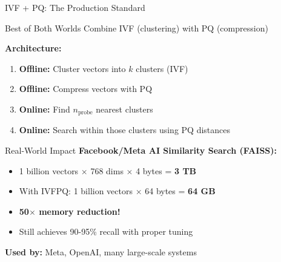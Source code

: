 \documentclass[aspectratio=169]{beamer}
\begin{document}
\begin{frame}[shrink=10]{IVF + PQ: The Production Standard}
\begin{block}{Best of Both Worlds}
Combine IVF (clustering) with PQ (compression)
\end{block}

\vspace{1em}

\textbf{Architecture:}
\begin{enumerate}
    \item \textbf{Offline:} Cluster vectors into $k$ clusters (IVF)
    \item \textbf{Offline:} Compress vectors with PQ
    \item \textbf{Online:} Find $n_{\text{probe}}$ nearest clusters
    \item \textbf{Online:} Search within those clusters using PQ distances
\end{enumerate}

\vspace{1em}

\begin{exampleblock}{Real-World Impact}
\textbf{Facebook/Meta AI Similarity Search (FAISS):}
\begin{itemize}
    \item 1 billion vectors $\times$ 768 dims $\times$ 4 bytes = \textbf{3 TB}
    \item With IVFPQ: 1 billion vectors $\times$ 64 bytes = \textbf{64 GB}
    \item \textbf{50$\times$ memory reduction!}
    \item Still achieves 90-95\% recall with proper tuning
\end{itemize}
\end{exampleblock}

\vspace{0.5em}

\textbf{Used by:} Meta, OpenAI, many large-scale systems
\end{frame}
\end{document}
